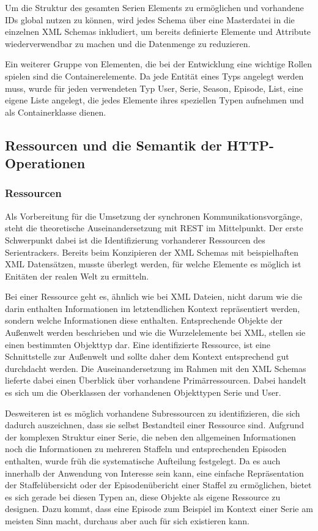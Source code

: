\documentclass[a4paper]{article}
\begin{document}
Um die Struktur des gesamten Serien Elements zu ermöglichen und vorhandene IDs global nutzen zu können, wird jedes Schema über eine Masterdatei in die einzelnen XML Schemas inkludiert, um bereits definierte Elemente und Attribute wiederverwendbar zu machen und die Datenmenge zu reduzieren.


Ein weiterer Gruppe von Elementen, die bei der Entwicklung eine wichtige Rollen spielen sind die Containerelemente. Da jede Entität eines Typs angelegt werden muss, wurde für jeden verwendeten Typ User, Serie, Season, Episode, List, eine eigene Liste angelegt, die jedes Elemente ihres speziellen Typen aufnehmen und als Containerklasse dienen.


\newpage

\subsection{Ressourcen und die Semantik der HTTP-Operationen}
\subsubsection{Ressourcen}

Als Vorbereitung für die Umsetzung der synchronen Kommunikationsvorgänge, steht die theoretische Auseinandersetzung mit REST im Mittelpunkt.
Der erste Schwerpunkt dabei ist die Identifizierung vorhanderer Ressourcen des Serientrackers. Bereits beim Konzipieren der XML Schemas mit beispielhaften XML Datensätzen, musste überlegt werden, für welche Elemente es möglich ist Enitäten der realen Welt zu ermitteln.

Bei einer Ressource geht es, ähnlich wie bei XML Dateien, nicht darum wie die darin enthalten Informationen im letztendlichen Kontext repräsentiert werden, sondern welche Informationen diese enthalten. Entsprechende Objekte der Außenwelt werden beschrieben und wie die Wurzelelemente bei XML, stellen sie einen bestimmten Objekttyp dar. Eine identifizierte Ressource, ist eine Schnittstelle zur Außenwelt und sollte daher dem Kontext entsprechend gut durchdacht werden.
Die Auseinandersetzung im Rahmen mit den XML Schemas lieferte dabei einen Überblick über vorhandene Primärressourcen. Dabei handelt es sich um die Oberklassen der vorhandenen Objekttypen Serie und User.

Desweiteren ist es möglich vorhandene Subressourcen zu identifizieren, die sich dadurch auszeichnen, dass sie selbst Bestandteil einer Ressource sind.
Aufgrund der komplexen Struktur einer Serie, die neben den allgemeinen Informationen noch die Informationen zu mehreren Staffeln und entsprechenden Episoden enthalten, wurde früh die systematische Aufteilung festgelegt.
Da es auch innerhalb der Anwendung von Interesse sein kann, eine einfache Repräsentation der Staffelübersicht oder der Episodenübericht einer Staffel zu ermöglichen, bietet es sich gerade bei diesen Typen an, diese Objekte als eigene Ressource zu designen. Dazu kommt, dass eine Episode zum Beispiel im Kontext einer Serie am meisten Sinn macht, durchaus aber auch für sich existieren kann.
\end{document}
